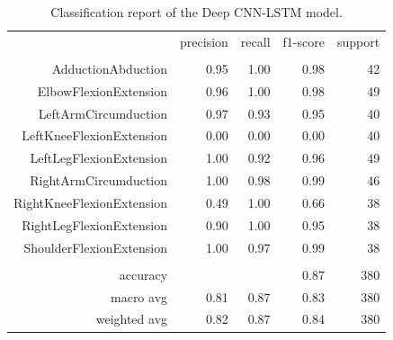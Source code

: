 \begin{table}[h!]
	\centering
	\caption{Classification report of the Deep CNN-LSTM model.}
	\label{tab:DeepCNNLSTMreport}
	\begin{tabular}{rrrrr}
		\multicolumn{1}{l}{}      & precision            & recall               & f1-score             & support              \\
		\multicolumn{1}{l}{}      &                      &                      &                      &                      \\
		AdductionAbduction        & 0.95                 & 1.00                 & 0.98                 & 42                   \\
		ElbowFlexionExtension     & 0.96                 & 1.00                 & 0.98                 & 49                   \\
		LeftArmCircumduction      & 0.97                 & 0.93                 & 0.95                 & 40                   \\
		LeftKneeFlexionExtension  & 0.00                 & 0.00                 & 0.00                 & 40                   \\
		LeftLegFlexionExtension   & 1.00                 & 0.92                 & 0.96                 & 49                   \\
		RightArmCircumduction     & 1.00                 & 0.98                 & 0.99                 & 46                   \\
		RightKneeFlexionExtension & 0.49                 & 1.00                 & 0.66                 & 38                   \\
		RightLegFlexionExtension  & 0.90                 & 1.00                 & 0.95                 & 38                   \\
		ShoulderFlexionExtension  & 1.00                 & 0.97                 & 0.99                 & 38                   \\
		\multicolumn{1}{l}{}      & \multicolumn{1}{l}{} & \multicolumn{1}{l}{} & \multicolumn{1}{l}{} & \multicolumn{1}{l}{} \\
		accuracy                  &                      &                      & 0.87                 & 380                  \\
		macro avg                 & 0.81                 & 0.87                 & 0.83                 & 380                  \\
		weighted avg              & 0.82                 & 0.87                 & 0.84                 & 380
	\end{tabular}%
\end{table}

